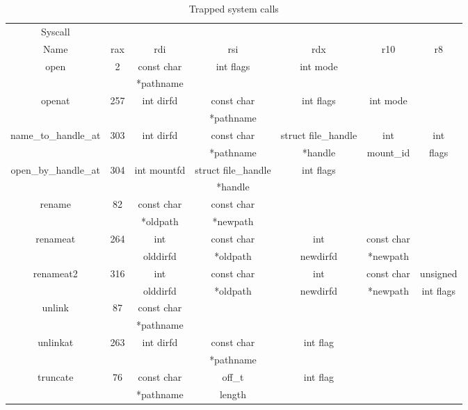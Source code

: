 \begin{table}[ht]
	\centering
	\footnotesize
	\caption{Trapped system calls}
	\label{tbl:prototypes}
	\begin{tabular}{ccccccc}
		\toprule
		Syscall 				&           	&  				& 						&  						&  					&   		\\
		Name 					& rax		  	& rdi 			& rsi 					& rdx 					& r10 				& r8 		\\
		\toprule
		open 					& 2 			&	const char	&	int flags			&	int mode			&					&		 	\\
								&   			&	*pathname	&						&						&					&		 	\\
		\hline
		openat	 				& 257  			&	int dirfd	&	const char 			&	int flags			&	int mode		&	 		\\
								&   			&				&	*pathname			&						&					&		 	\\
		\hline
		name\_to\_handle\_at 	& 303  			&	int dirfd	&	const char			&	struct file\_handle	&	int				&	int	 	\\
								&   			&				&	*pathname			&	*handle				&	mount\_id		&	flags 	\\
		\hline
		open\_by\_handle\_at 	& 304  			&	int mountfd	&	struct file\_handle	&	int	flags			&					&		 	\\
								&   			&				&	*handle				&						&					&		 	\\
		\hline
		rename 					& 82  			&	const char	&	const char			&						&	 				&		 	\\
								&   			&	*oldpath	&	*newpath			&						&					&			\\
		\hline
		renameat 				& 264  			&	int 		&	const char 			&	int 				&	const char 		&	 		\\
								&   			&	olddirfd	&	*oldpath			&	newdirfd			&	*newpath		& 			\\ 
		\hline
		renameat2 				& 316  			&	int			&	const char 			&	int 				&	const char 		&	unsigned\\
								&   			&	olddirfd	&	*oldpath			&	newdirfd			&	*newpath		& 	int flags\\ 
		\hline
		unlink 					& 87  			&	const char	&						&						&					&		 	\\
								&   			&	*pathname	&						&						&					&		 	\\ 
		\hline
		unlinkat 				& 263  			&	int dirfd	&	const char			&	int flag			&					&		 	\\
								&   			&				&	*pathname			&						&					&		 	\\
		\hline
		truncate 				& 76  			&	const char	&	off\_t				&	int flag			&					&		 	\\
								&   			&	*pathname	&	length				&						&					&		 	\\
		\bottomrule
	\end{tabular}	
\end{table}

